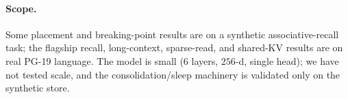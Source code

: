 \paragraph{Scope.} Some placement and breaking-point results are on a synthetic
associative-recall task; the flagship recall, long-context, sparse-read, and
shared-KV results are on real PG-19 language. The model is small (6 layers,
$256$-d, single head); we have not tested scale, and the consolidation/sleep
machinery is validated only on the synthetic store.
